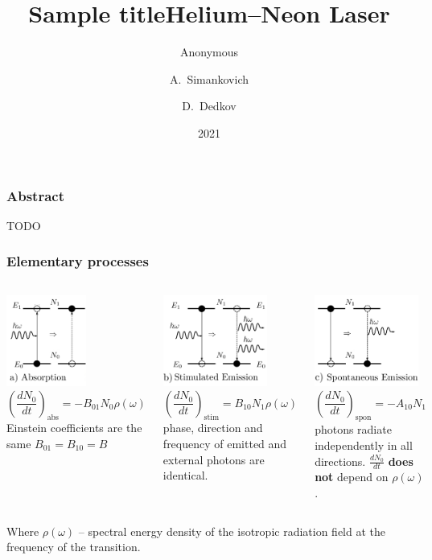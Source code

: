 \documentclass{beamer}
\title{Sample title}
\author{Anonymous}
\institute{Overleaf}
\date{2021}
\title[About Beamer] %
{Helium–Neon Laser}
\author[Arthur, Doe] %
{A.~Simankovich \and D.~Dedkov }
\institute[VFU] %
{
	Moscow Institute of Physics and Technology
}
\date[VLC 2023] %
\begin{document}
	
	\frame{\titlepage}
	
	\begin{frame}
		\frametitle{Abstract}
		TODO

	\end{frame}
	
	\begin{frame}
		\frametitle{Elementary processes}
		
		\begin{columns}[t]
			\footnotesize
			
			\includegraphics[height=3cm]{res/emission_types_1.jpg}
			$$\left(\frac{dN_0}{dt}\right)_{\text{abs}} = - B_{01} N_0 \rho(\omega)$$
			Einstein coefficients are the same $B_{01} = B_{10} = B$ 

			\includegraphics[height=3cm]{res/emission_types_2.jpg}
			$$\left(\frac{dN_0}{dt}\right)_{\text{stim}} = B_{10} N_1 \rho(\omega)$$
			phase, direction and frequency of emitted and external photons are identical.
		
			\includegraphics[height=3cm]{res/emission_types_3.jpg}
			$$\left(\frac{dN_0}{dt}\right)_{\text{spon}} = - A_{10} N_1$$
			photons radiate independently in all directions. $\frac{dN_0}{dt}$ \textbf{does not} depend on $\rho(\omega)$.
		
		\end{columns}
		\vspace{10pt}
		\footnotesize
		Where $\rho(\omega)$ -- spectral energy density of the isotropic radiation field at the frequency of the transition.
	\end{frame}
\end{document}

